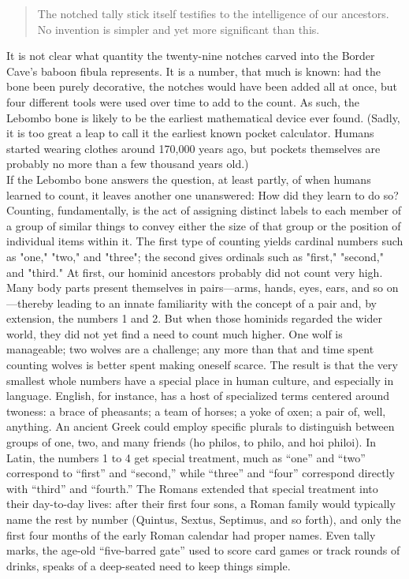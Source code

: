 \begin{quote}
The notched tally stick itself testifies to the intelligence of our ancestors. No invention is simpler and yet more significant than this.
\end{quote}
It is not clear what quantity the twenty-nine notches carved into the Border Cave’s baboon fibula represents. It is a number, that much is known: had the bone been purely decorative, the notches would have been added all at once, but four different tools were used over time to add to the count. As such, the Lebombo bone is likely to be the earliest mathematical device ever found. (Sadly, it is too great a leap to call it the earliest known pocket calculator. Humans started wearing clothes around 170,000 years ago, but pockets themselves are probably no more than a few thousand years old.)\\
If the Lebombo bone answers the question, at least partly, of when humans learned to count, it leaves another one unanswered: How did they learn to do so?\\
Counting, fundamentally, is the act of assigning distinct labels to each member of a group of similar things to convey either the size of that group or the position of individual items within it. The first type of counting yields cardinal numbers such as "one," "two," and "three"; the second gives ordinals such as "first," "second," and "third."
At first, our hominid ancestors probably did not count very high. Many body parts present themselves in pairs—arms, hands, eyes, ears, and so on—thereby leading to an innate familiarity with the concept of a pair and, by extension, the numbers 1 and 2. But when those hominids regarded the wider world, they did not yet find a need to count much higher. One wolf is manageable; two wolves are a challenge; any more than that and time spent counting wolves is better spent making oneself scarce. The result is that the very smallest whole numbers have a special place in human culture, and especially in language. English, for instance, has a host of specialized terms centered around twoness: a brace of pheasants; a team of horses; a yoke of oxen; a pair of, well, anything. An ancient Greek could employ specific plurals to distinguish between groups of one, two, and many friends (ho philos, to philo, and hoi philoi). In Latin, the numbers 1 to 4 get special treatment, much as “one” and “two” correspond to “first” and “second,” while “three” and “four” correspond directly with “third” and “fourth.” The Romans extended that special treatment into their day-to-day lives: after their first four sons, a Roman family would typically name the rest by number (Quintus, Sextus, Septimus, and so forth), and only the first four months of the early Roman calendar had proper names. Even tally marks, the age-old “five-barred gate” used to score card games or track rounds of drinks, speaks of a deep-seated need to keep things simple.\\
